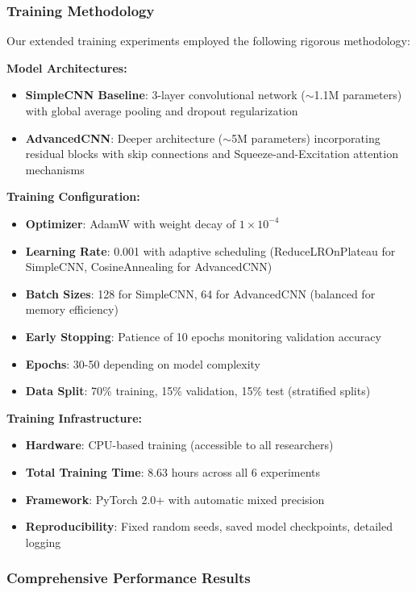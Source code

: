 \documentclass[12pt,a4paper]{article}
\begin{document}
\subsubsection{Training Methodology}

Our extended training experiments employed the following rigorous methodology:

\textbf{Model Architectures:}
\begin{itemize}
    \item \textbf{SimpleCNN Baseline}: 3-layer convolutional network ($\sim$1.1M parameters) with global average pooling and dropout regularization
    \item \textbf{AdvancedCNN}: Deeper architecture ($\sim$5M parameters) incorporating residual blocks with skip connections and Squeeze-and-Excitation attention mechanisms
\end{itemize}

\textbf{Training Configuration:}
\begin{itemize}
    \item \textbf{Optimizer}: AdamW with weight decay of $1 \times 10^{-4}$
    \item \textbf{Learning Rate}: 0.001 with adaptive scheduling (ReduceLROnPlateau for SimpleCNN, CosineAnnealing for AdvancedCNN)
    \item \textbf{Batch Sizes}: 128 for SimpleCNN, 64 for AdvancedCNN (balanced for memory efficiency)
    \item \textbf{Early Stopping}: Patience of 10 epochs monitoring validation accuracy
    \item \textbf{Epochs}: 30-50 depending on model complexity
    \item \textbf{Data Split}: 70\% training, 15\% validation, 15\% test (stratified splits)
\end{itemize}

\textbf{Training Infrastructure:}
\begin{itemize}
    \item \textbf{Hardware}: CPU-based training (accessible to all researchers)
    \item \textbf{Total Training Time}: 8.63 hours across all 6 experiments
    \item \textbf{Framework}: PyTorch 2.0+ with automatic mixed precision
    \item \textbf{Reproducibility}: Fixed random seeds, saved model checkpoints, detailed logging
\end{itemize}

\subsubsection{Comprehensive Performance Results}
\end{document}

